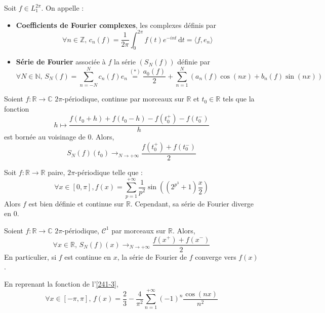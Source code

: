 
  \begin{definition}
    Soit $f \in L_1^{2\pi}$. On appelle :
    \begin{itemize}
      \item \textbf{Coefficients de Fourier complexes}, les complexes définis par
      \[ \forall n \in \mathbb{Z}, \, c_n(f) = \frac{1}{2 \pi} \int_0^{2\pi} f(t) e^{-int} \, \mathrm{d}t = \langle f, e_n \rangle \]
      \item \textbf{Série de Fourier} associée à $f$ la série $(S_N(f))$ définie par
      \[ \forall N \in \mathbb{N}, \, S_N(f) = \sum_{n=-N}^{N} c_n(f) e_n \overset{(*)}{=} \frac{a_0(f)}{2} + \sum_{n = 1}^N (a_n(f) \cos(nx) + b_n(f) \sin(nx)) \]
    \end{itemize}
  \end{definition}


  \begin{theorem}[Dirichlet]
    Soient $f : \mathbb{R} \rightarrow \mathbb{C}$ $2\pi$-périodique, continue par morceaux sur $\mathbb{R}$ et $t_0 \in \mathbb{R}$ tels que la fonction
    \[ h \mapsto \frac{f(t_0 + h) + f(t_0 - h) - f(t_0^+) - f(t_0^-)}{h} \]
    est bornée au voisinage de $0$. Alors,
    \[ S_N(f)(t_0) \longrightarrow_{N \rightarrow +\infty} \frac{f(t_0^+) + f(t_0^-)}{2} \]
  \end{theorem}

  \begin{cexample}
    Soit $f : \mathbb{R} \rightarrow \mathbb{R}$ paire, $2\pi$-périodique telle que :
    \[ \forall x \in [0, \pi], f(x) = \sum_{p=1}^{+\infty} \frac{1}{p^2} \sin \left( (2^{p^3} + 1) \frac{x}{2} \right)
    \]
    Alors $f$ est bien définie et continue sur $\mathbb{R}$. Cependant, sa série de Fourier diverge en $0$.
  \end{cexample}

  \begin{corollary}
    Soient $f : \mathbb{R} \rightarrow \mathbb{C}$ $2\pi$-périodique, $\mathcal{C}^1$ par morceaux sur $\mathbb{R}$. Alors,
    \[ \forall x \in \mathbb{R}, \, S_N(f)(x) \longrightarrow_{N \rightarrow +\infty} \frac{f(x^+) + f(x^-)}{2} \]
    En particulier, si $f$ est continue en $x$, la série de Fourier de $f$ converge vers $f(x)$.
  \end{corollary}

  \begin{example}
    \label{241-3}
    En reprenant la fonction de l'\cref{241-3},
    \[ \forall x \in [-\pi, \pi], \, f(x) = \frac{2}{3} - \frac{4}{\pi^2} \sum_{n=1}^{+\infty} (-1)^n \frac{\cos(nx)}{n^2} \]
  \end{example}

